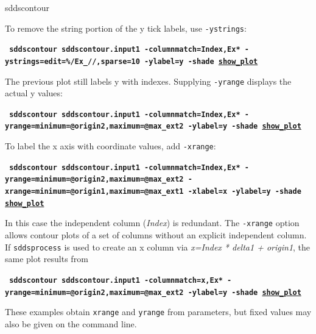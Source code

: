\begin{sddsprog}{sddscontour}
\begin{itemize}
        To remove the string portion of the y tick labels, use \verb|-ystrings|:
        \begin{flushleft}{\tt \bf
            sddscontour sddscontour.input1 -columnmatch=Index,Ex* -ystrings=edit=\%/Ex_//,sparse=10 -ylabel=y -shade
            \href{https://ops.aps.anl.gov/manuals/example_files/sddscontour2_img.html}{show\_plot}
        }\end{flushleft}

        The previous plot still labels y with indexes.  Supplying \verb|-yrange| displays the actual y values:
        \begin{flushleft}{\tt \bf
            sddscontour sddscontour.input1 -columnmatch=Index,Ex* -yrange=minimum=@origin2,maximum=@max\_ext2 -ylabel=y -shade
            \href{https://ops.aps.anl.gov/manuals/example_files/sddscontour3_img.html}{show\_plot}
        }\end{flushleft}

        To label the x axis with coordinate values, add \verb|-xrange|:
        \begin{flushleft}{\tt \bf
            sddscontour sddscontour.input1 -columnmatch=Index,Ex* -yrange=minimum=@origin2,maximum=@max\_ext2 -xrange=minimum=@origin1,maximum=@max\_ext1 -xlabel=x -ylabel=y -shade \href{https://ops.aps.anl.gov/manuals/example_files/sddscontour4_img.html}{show\_plot}
        }\end{flushleft}

        In this case the independent column ({\em Index}) is redundant.  The \verb|-xrange| option allows contour plots of a set
        of columns without an explicit independent column.  If \verb|sddsprocess| is used to create an x column via
        {\em x=Index * delta1 + origin1}, the same plot results from
        \begin{flushleft}{\tt \bf
            sddscontour sddscontour.input1 -columnmatch=x,Ex* -yrange=minimum=@origin2,maximum=@max\_ext2 -ylabel=y -shade \href{https://ops.aps.anl.gov/manuals/example_files/sddscontour5_img.html}{show\_plot}
        }\end{flushleft}

        These examples obtain \verb|xrange| and \verb|yrange| from parameters, but fixed values may also be given on the command line.



\end{itemize}
\end{sddsprog}
